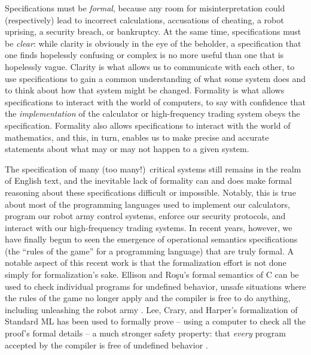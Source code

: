 Specifications must be {\it formal}, because any room for
misinterpretation could (respectively) lead to incorrect calculations,
accusations of cheating, a robot uprising, a security breach, or
bankruptcy. At the same time, specifications must be {\it clear}:
while clarity is obviously in the eye of the beholder, a specification
that one finds hopelessly confusing or complex is no more useful than
one that is hopelessly vague.
%
Clarity is what allows us to
communicate with each other, to use specifications to gain a common
understanding of what some system does and to think about how that
system might be changed. Formality is what allows specifications to
interact with the world of computers, to say with confidence that the
{\it implementation} of the calculator or high-frequency trading
system obeys the specification. Formality also allows specifications
to interact with the world of mathematics, and this, in turn, enables
us to make precise and accurate statements about what may or may not
happen to a given system.

The specification of many (too many!)~critical systems still remains
in the realm of English text, and the inevitable lack of formality can
and does make formal reasoning about these specifications difficult or
impossible.
%
Notably, this is true about most of the programming languages used to
implement our calculators, program our robot army control systems,
enforce our security protocols, and interact with our high-frequency
trading systems. In recent years, however, we have finally begun to
seen the emergence of operational semantics specifications (the
``rules of the game'' for a programming language) that are truly
formal. A notable aspect of this recent work is that the formalization
effort is not done simply for formalization's sake. Ellison and Ro{\c
  s}u's formal semantics of C can be used to check individual programs
for undefined behavior, unsafe situations where the rules of the game
no longer apply and the compiler is free to do anything, including
unleashing the robot army \cite{ellison12executable}. Lee, Crary, and
Harper's formalization of Standard ML has been used to formally prove
-- using a computer to check all the proof's formal details -- a much
stronger safety property: that {\it every} program accepted by the
compiler is free of undefined behavior \cite{lee07towards}.

